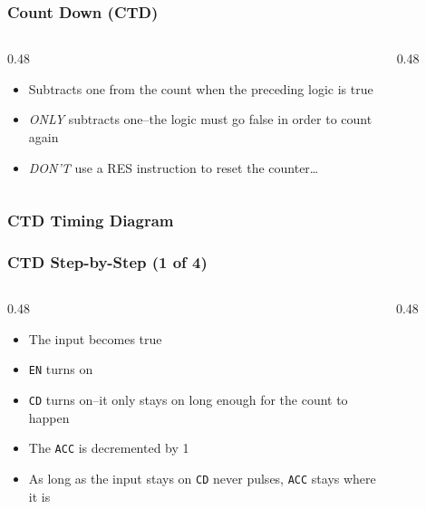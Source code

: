 \begin{frame}
    \frametitle{Count Down (CTD)}

    \begin{columns}
        \begin{column}{0.48\linewidth}
            \begin{itemize}
                \item Subtracts one from the count when the preceding logic is true
                \item \emph{ONLY} subtracts one--the logic must go false in order to count again
                \item \emph{DON'T} use a RES instruction to reset the counter\dots
            \end{itemize}
        \end{column}
        \begin{column}{0.48\linewidth}
            \begin{figure}
                \centering
                
            \end{figure}
        \end{column}
    \end{columns}
\end{frame}

\begin{frame}
    \frametitle{CTD Timing Diagram}

    \centering
    \resizebox{0.875\linewidth}{!}{
        
    }
\end{frame}

\begin{frame}
    \frametitle{CTD Step-by-Step (1 of 4)}

    \begin{columns}
        \begin{column}{0.48\linewidth}
            \begin{itemize}
                \item The input becomes true
                \item \texttt{EN} turns on
                \item \texttt{CD} turns on--it only stays on long enough for the count to happen
                \item The \texttt{ACC} is decremented by 1
                \item As long as the input stays on \texttt{CD} never pulses, \texttt{ACC} stays where it is
            \end{itemize}
        \end{column}
        \begin{column}{0.48\linewidth}
            \begin{figure}
                \centering
                \resizebox{\columnwidth}{!}{
                    
                }
            \end{figure}
        \end{column}
    \end{columns}
\end{frame}

